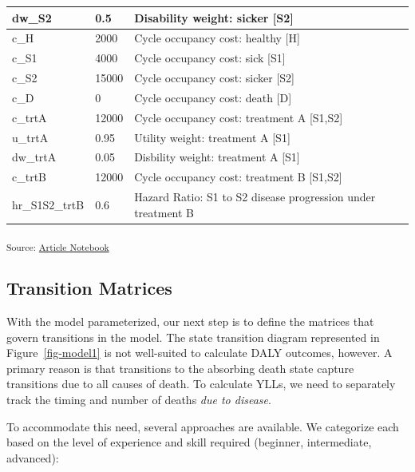\documentclass[
]{agujournal2019}
\begin{document}
\begin{table}
{\begin{tabular}{l|l|l}
dw\_S2 & 0.5 & Disability weight: sicker [S2]\\
\hline
c\_H & 2000 & Cycle occupancy cost: healthy [H]\\
\hline
c\_S1 & 4000 & Cycle occupancy cost: sick [S1]\\
\hline
c\_S2 & 15000 & Cycle occupancy cost: sicker [S2]\\
\hline
c\_D & 0 & Cycle occupancy cost: death [D]\\
\hline
c\_trtA & 12000 & Cycle occupancy cost: treatment A [S1,S2]\\
\hline
u\_trtA & 0.95 & Utility weight: treatment A [S1]\\
\hline
dw\_trtA & 0.05 & Disbility weight: treatment A [S1]\\
\hline
c\_trtB & 12000 & Cycle occupancy cost: treatment B [S1,S2]\\
\hline
hr\_S1S2\_trtB & 0.6 & Hazard Ratio: S1 to S2 disease progression under treatment B\\
\hline
\end{tabular}

}

\end{table}%

\textsubscript{Source:
\href{https://graveja0.github.io/dalys/index.qmd.html}{Article
Notebook}}

\subsection{Transition Matrices}\label{transition-matrices}

With the model parameterized, our next step is to define the matrices
that govern transitions in the model. The state transition diagram
represented in Figure~\ref{fig-model1} is not well-suited to calculate
DALY outcomes, however. A primary reason is that transitions to the
absorbing death state capture transitions due to all causes of death. To
calculate YLLs, we need to separately track the timing and number of
deaths \emph{due to disease}.

To accommodate this need, several approaches are available. We
categorize each based on the level of experience and skill required
(beginner, intermediate, advanced):
\end{document}
